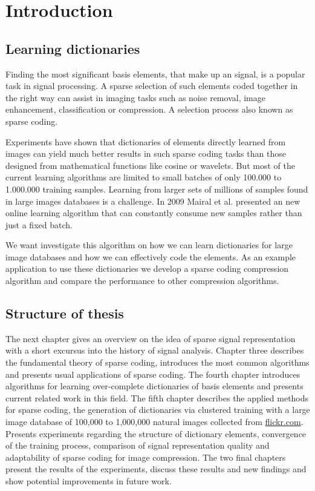 \chapter{Introduction}
\label{sec:introduction}
\section{Learning dictionaries}

Finding the most significant basis elements, that make up an
signal, is a popular task in signal processing. A sparse selection of such
elements coded together in the right way can assist in imaging tasks such as
noise removal, image enhancement, classification or compression. A selection
process also known as sparse coding.

Experiments \cite{Chen1998,Elad2006} have shown that dictionaries of 
elements directly learned from images can yield much better results in
such sparse coding tasks than those designed from mathematical functions like
cosine or wavelets. But most of the current learning algorithms are limited to
small batches of only 100.000 to 1.000.000 training samples. Learning from
larger sets of millions of samples found in large images databases is a
challenge. In 2009 Mairal et al.\cite{Mairal2009} presented an new online
learning algorithm that can constantly consume new samples rather than just a
fixed batch. 

We want investigate this algorithm on how we can learn dictionaries
for large image databases and how we can effectively code the elements.
As an example application to use these dictionaries we develop a sparse coding
compression algorithm and compare the performance to other
compression algorithms.

\section{Structure of thesis}
The next chapter gives an overview on the idea of sparse signal
representation with a short excursus into the history of signal analysis.
Chapter three describes the fundamental theory of sparse coding, introduces the
most common algorithms and presents usual applications of sparse coding. The
fourth chapter introduces algorithms for learning over-complete
dictionaries of basis elements and presents current related work in this field.
The fifth chapter describes the applied methods for sparse
coding, the generation of dictionaries via clustered training with a large image
database of 100,000 to 1,000,000 natural images collected from \url{flickr.com}.
Presents experiments regarding the structure of dictionary elements, convergence
of the training process, comparison of signal representation quality and
adaptability of sparse coding for image compression. The two final chapters
present the results of the experiments, discuss these results and new findings
and show potential improvements in future work. 

